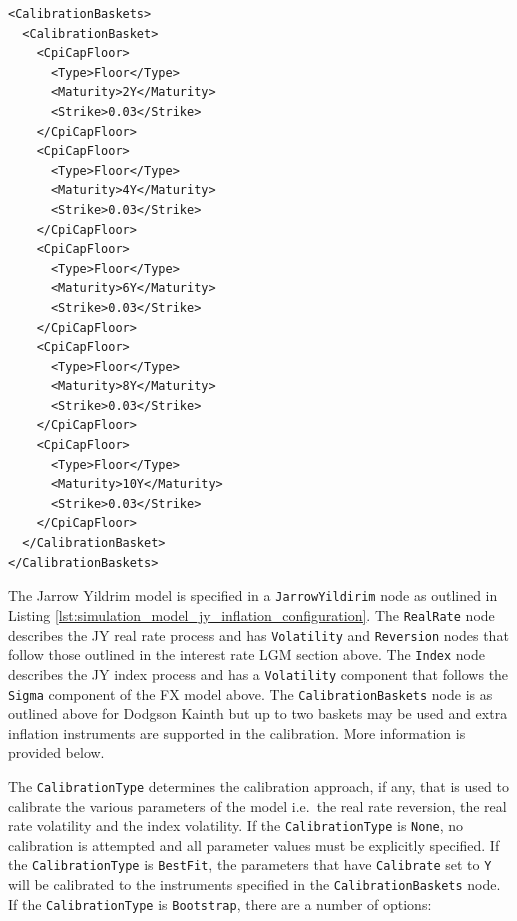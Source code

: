 \begin{listing}[H]
\begin{verbatim}
<CalibrationBaskets>
  <CalibrationBasket>
    <CpiCapFloor>
      <Type>Floor</Type>
      <Maturity>2Y</Maturity>
      <Strike>0.03</Strike>
    </CpiCapFloor>
    <CpiCapFloor>
      <Type>Floor</Type>
      <Maturity>4Y</Maturity>
      <Strike>0.03</Strike>
    </CpiCapFloor>
    <CpiCapFloor>
      <Type>Floor</Type>
      <Maturity>6Y</Maturity>
      <Strike>0.03</Strike>
    </CpiCapFloor>
    <CpiCapFloor>
      <Type>Floor</Type>
      <Maturity>8Y</Maturity>
      <Strike>0.03</Strike>
    </CpiCapFloor>
    <CpiCapFloor>
      <Type>Floor</Type>
      <Maturity>10Y</Maturity>
      <Strike>0.03</Strike>
    </CpiCapFloor>
  </CalibrationBasket>
</CalibrationBaskets>
\end{verbatim}
\caption{Calibration basket for DK inflation model component}
\label{lst:dk_inflation_calibration_basket}
\end{listing}

The Jarrow Yildrim model is specified in a \lstinline!JarrowYildirim! node as outlined in Listing \ref{lst:simulation_model_jy_inflation_configuration}. The \lstinline!RealRate!
node describes the JY real rate process and has \lstinline!Volatility! and \lstinline!Reversion! nodes that follow those outlined in the interest rate LGM section above. The
\lstinline!Index! node describes the JY index process and has a \lstinline!Volatility! component that follows the \lstinline!Sigma! component of the FX model above. The
\lstinline!CalibrationBaskets! node is as outlined above for Dodgson Kainth but up to two baskets may be used and extra inflation instruments are supported in the calibration. More
information is provided below.

The \lstinline!CalibrationType! determines the calibration approach, if any, that is used to calibrate the various parameters of the model i.e.\ the real rate reversion, the real
rate volatility and the index volatility. If the \lstinline!CalibrationType! is \lstinline!None!, no calibration is attempted and all parameter values must be explicitly specified.
If the \lstinline!CalibrationType! is \lstinline!BestFit!, the parameters that have \lstinline!Calibrate! set to \lstinline!Y! will be calibrated to the instruments specified in
the \lstinline!CalibrationBaskets! node. If the \lstinline!CalibrationType! is \lstinline!Bootstrap!, there are a number of options:

